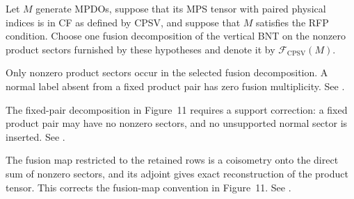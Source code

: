 \begin{definition}%
    \label{def:mpdo_literal_cpsv_rfp_bnt_fusion_tensor_clause}
    \leanok
    Let $M$ generate MPDOs, suppose that its MPS tensor with paired physical
    indices is in CF as defined by CPSV, and suppose that $M$ satisfies the
    RFP condition. Choose one fusion decomposition of the vertical BNT on
    the nonzero product sectors furnished by these hypotheses and denote it
    by $\mathcal F_{\mathrm{CPSV}}(M)$.

    Only nonzero product sectors occur in the selected fusion decomposition.
    A normal label absent from a fixed product pair has zero fusion
    multiplicity. See
    \cite{gap:cpsv16_bnt_uniqueness_zero_coefficient}.

    The fixed-pair decomposition in Figure~11 requires a support correction:
    a fixed product pair may have no nonzero sectors, and no unsupported
    normal sector is inserted. See
    \cite{gap:cpsv16_figure11_per_pair_support}.

    The fusion map restricted to the retained rows is a coisometry onto the
    direct sum of nonzero sectors, and its adjoint gives exact reconstruction
    of the product tensor. This corrects the fusion-map convention in
    Figure~11. See
    \cite{gap:cpsv16_figure11_fusion_coisometry}.
\end{definition}

